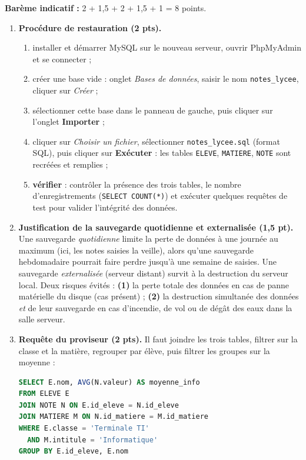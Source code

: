 \documentclass[11pt]{article}
\begin{document}
\begin{corrige}
\textbf{Barème indicatif :} 2 + 1,5 + 2 + 1,5 + 1 = 8 points.
\begin{enumerate}
\item \textbf{Procédure de restauration (2 pts).}
\begin{enumerate}
\item installer et démarrer MySQL sur le nouveau serveur, ouvrir PhpMyAdmin et se connecter ;
\item créer une base vide : onglet \emph{Bases de données}, saisir le nom \texttt{notes\_lycee}, cliquer sur \emph{Créer} ;
\item sélectionner cette base dans le panneau de gauche, puis cliquer sur l'onglet \textbf{Importer} ;
\item cliquer sur \emph{Choisir un fichier}, sélectionner \texttt{notes\_lycee.sql} (format SQL), puis cliquer sur \textbf{Exécuter} : les tables \texttt{ELEVE}, \texttt{MATIERE}, \texttt{NOTE} sont recréées et remplies ;
\item \textbf{vérifier} : contrôler la présence des trois tables, le nombre d'enregistrements (\texttt{SELECT COUNT(*)}) et exécuter quelques requêtes de test pour valider l'intégrité des données.
\end{enumerate}
\item \textbf{Justification de la sauvegarde quotidienne et externalisée (1,5 pt).} Une sauvegarde \emph{quotidienne} limite la perte de données à une journée au maximum (ici, les notes saisies la veille), alors qu'une sauvegarde hebdomadaire pourrait faire perdre jusqu'à une semaine de saisies. Une sauvegarde \emph{externalisée} (serveur distant) survit à la destruction du serveur local. Deux risques évités : \textbf{(1)} la perte totale des données en cas de panne matérielle du disque (cas présent) ; \textbf{(2)} la destruction simultanée des données \emph{et} de leur sauvegarde en cas d'incendie, de vol ou de dégât des eaux dans la salle serveur.
\item \textbf{Requête du proviseur (2 pts).} Il faut joindre les trois tables, filtrer sur la classe et la matière, regrouper par élève, puis filtrer les groupes sur la moyenne :
\begin{lstlisting}[language=SQL]
SELECT E.nom, AVG(N.valeur) AS moyenne_info
FROM ELEVE E
JOIN NOTE N ON E.id_eleve = N.id_eleve
JOIN MATIERE M ON N.id_matiere = M.id_matiere
WHERE E.classe = 'Terminale TI'
  AND M.intitule = 'Informatique'
GROUP BY E.id_eleve, E.nom

\end{lstlisting}
\end{enumerate}
\end{corrige}
\end{document}
